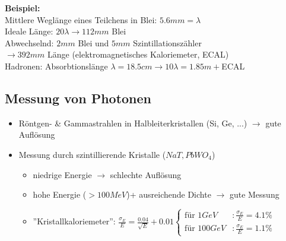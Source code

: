 \documentclass[Ex4_Zusammenfassung.tex]{subfiles}
\begin{document}
\textbf{Beispiel:}\\
Mittlere Weglänge eines Teilchens in Blei: $5.6 \si{mm} = \lambda$\\
Ideale Länge: $20 \lambda \rightarrow 112 \si{mm}$ Blei\\
Abwechselnd: $2 \si{mm}$ Blei und  $5 \si{mm}$ Szintillationszähler\\
$\rightarrow 392 \si{mm}$ Länge (elektromagnetisches Kaloriemeter, ECAL)\\

Hadronen: Absorbtionslänge $\lambda = 18.5 \si{cm} \rightarrow 10 \lambda = 1.85 \si{m}+$ECAL

\subsection*{Messung von Photonen}
\begin{itemize}
	\item Röntgen- \& Gammastrahlen in Halbleiterkristallen (Si, Ge, ...) $\rightarrow$ gute Auflösung
	\item Messung durch szintillierende Kristalle ($NaT, PbWO_4$)
		\begin{itemize}
			\item niedrige Energie $\rightarrow$ schlechte Auflösung
			\item hohe Energie ($>100 \si{MeV}$)+ ausreichende Dichte $\rightarrow$ gute Messung
			\item ''Kristallkaloriemeter'': $\frac{\sigma_E}{E} = \frac{0.04}{\sqrt{E}} + 0.01 
				\begin{cases}
					\text{für }1 \si{GeV}&: \frac{\sigma_E}{E}=4.1\% \\
					\text{für }100 \si{GeV} &: \frac{\sigma_E}{E} = 1.1\%
				\end{cases}$
		\end{itemize}
\end{itemize}
\end{document}
